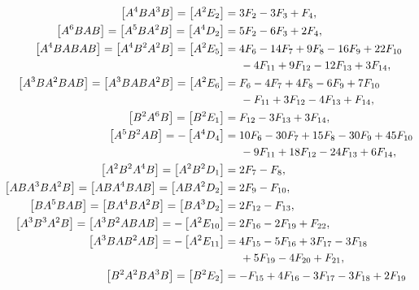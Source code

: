 \documentclass[12pt]{article}
\begin{document}
\begin{equation}
  \begin{aligned}
    \nonumber
    \left [ A^{4} B A^{3} B \right ] = \left [ A^{2} E_{2} \right ] &= 3 F_{2} - 3 F_{3} + F_{4}, \\
    \left [ A^{6} B A B \right ] = \left [ A^{5} B A^{2} B \right ] = \left [ A^{4} D_{2} \right ] &= 5 F_{2} - 6 F_{3} + 2 F_{4}, \\
    \left [ A^{4} B A B A B \right ] = \left [ A^{4} B^{2} A^{2} B \right ] = \left [ A^{2} E_{5} \right ] &= 4 F_{6} - 14 F_{7} + 9 F_{8} - 16 F_{9} + 22 F_{10} \\
    &\hspace{0.5cm} - 4 F_{11} + 9 F_{12} - 12 F_{13} + 3 F_{14}, \\
    \left [ A^{3} B A^{2} B A B \right ] = \left [ A^{3} B A B A^{2} B \right ] = \left [ A^{2} E_{6} \right ] &= F_{6} - 4 F_{7} + 4 F_{8} - 6 F_{9} + 7 F_{10} \\
    &\hspace{0.5cm} - F_{11} + 3 F_{12} - 4 F_{13} + F_{14}, \\
    \left [ B^{2} A^{6} B \right ] = \left [ B^{2} E_{1} \right ] &= F_{12} - 3 F_{13} + 3 F_{14}, \\
    \left [ A^{5} B^{2} A B \right ] = - \left [ A^{4} D_{4} \right ] &= 10 F_{6} - 30 F_{7} + 15 F_{8} - 30 F_{9} + 45 F_{10} \\
    &\hspace{0.5cm} - 9 F_{11} + 18 F_{12} - 24 F_{13} + 6 F_{14}, \\
    \left [ A^{2} B^{2} A^{4} B \right ] = \left [ A^{2} B^{2} D_{1} \right ] &= 2 F_{7} - F_{8}, \\
    \left [ A B A^{3} B A^{2} B \right ] = \left [ A B A^{4} B A B \right ] = \left [ A B A^{2} D_{2} \right ] &= 2 F_{9} - F_{10}, \\
    \left [ B A^{5} B A B \right ] = \left [ B A^{4} B A^{2} B \right ] = \left [ B A^{3} D_{2} \right ] &= 2 F_{12} - F_{13}, \\
    \left [ A^{3} B^{3} A^{2} B \right ] = \left [ A^{3} B^{2} A B A B \right ] = - \left [ A^{2} E_{10} \right ] &= 2 F_{16} - 2 F_{19} + F_{22}, \\
    \left [ A^{3} B A B^{2} A B \right ] = - \left [ A^{2} E_{11} \right ] &= 4 F_{15} - 5 F_{16} + 3 F_{17} - 3 F_{18} \\
    &\hspace{0.5cm} + 5 F_{19} - 4 F_{20} + F_{21}, \\
    \left [ B^{2} A^{2} B A^{3} B \right ] = \left [ B^{2} E_{2} \right ] &= - F_{15} + 4 F_{16} - 3 F_{17} - 3 F_{18} + 2 F_{19} \\

\end{aligned}
\end{equation}
\end{document}
